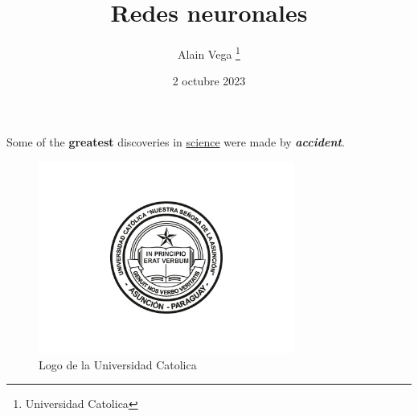 \documentclass[12pt, letterpaper]{article}
\title{Redes neuronales}
\author{Alain Vega \thanks{Universidad Catolica}}
\date{2 octubre 2023}
\begin{document}
\maketitle %
Some of the \textbf{greatest}
discoveries in \underline{science}
were made by \textbf{\textit{accident}}.
\begin{figure}[h]
    \centering
    \includegraphics[width=0.75\textwidth]{ucalogo}
    \caption{Logo de la Universidad Catolica}
    \label{fig:mesh1}
\end{figure}
\end{document}
